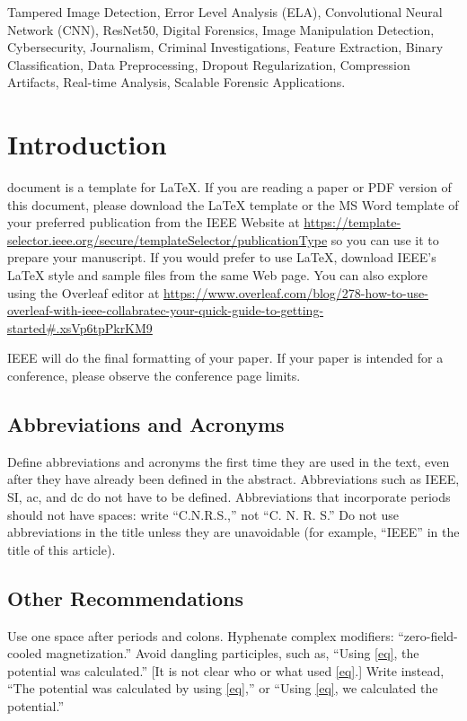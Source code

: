 \documentclass{ieeeaccess}
\begin{document}
\begin{keywords}
	Tampered Image Detection, Error Level Analysis (ELA), Convolutional Neural Network (CNN), ResNet50, Digital Forensics, Image Manipulation Detection, Cybersecurity, Journalism, Criminal Investigations, Feature Extraction, Binary Classification, Data Preprocessing, Dropout Regularization, Compression Artifacts, Real-time Analysis, Scalable Forensic Applications.
\end{keywords}

\titlepgskip=-21pt

\maketitle

\section{Introduction}
\label{sec:introduction}
 document is a template for \LaTeX. If you are reading a paper or PDF version of this document, please download the LaTeX template or the MS Word
template of your preferred publication from the IEEE Website at \underline
{https://template-selector.ieee.org/secure/templateSelec}\break\underline{tor/publicationType} so you can use it to prepare your manuscript. 
If you would prefer to use LaTeX, download IEEE's LaTeX style and sample files
from the same Web page. You can also explore using the Overleaf editor at
\underline
{https://www.overleaf.com/blog/278-how-to-use-overleaf-}\break\underline{with-ieee-collabratec-your-quick-guide-to-getting-started}\break\underline{\#.xsVp6tpPkrKM9}

IEEE will do the final formatting of your paper. If your paper is intended
for a conference, please observe the conference page limits.

\subsection{Abbreviations and Acronyms}
Define abbreviations and acronyms the first time they are used in the text,
even after they have already been defined in the abstract. Abbreviations
such as IEEE, SI, ac, and dc do not have to be defined. Abbreviations that
incorporate periods should not have spaces: write ``C.N.R.S.,'' not ``C. N.
R. S.'' Do not use abbreviations in the title unless they are unavoidable
(for example, ``IEEE'' in the title of this article).

\subsection{Other Recommendations}
Use one space after periods and colons. Hyphenate complex modifiers:
``zero-field-cooled magnetization.'' Avoid dangling participles, such as,
``Using \eqref{eq}, the potential was calculated.'' [It is not clear who or what
used \eqref{eq}.] Write instead, ``The potential was calculated by using \eqref{eq},'' or
``Using \eqref{eq}, we calculated the potential.''
\end{document}
